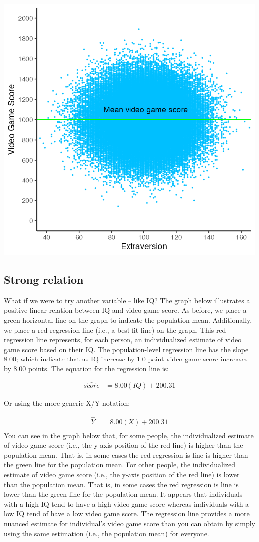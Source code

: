 \documentclass[
]{krantz}
\begin{document}
\includegraphics[width=0.7\linewidth]{ch_correlation/images/pop_graph_extraversion_mean}

\hypertarget{strong-relation}{%
\subsection{Strong relation}\label{strong-relation}}

What if we were to try another variable -- like IQ? The graph below illustrates a positive linear relation between IQ and video game score. As before, we place a green horizontal line on the graph to indicate the population mean. Additionally, we place a red regression line (i.e., a best-fit line) on the graph. This red regression line represents, for each person, an individualized estimate of video game score based on their IQ. The population-level regression line has the slope 8.00; which indicate that as IQ increase by 1.0 point video game score increases by 8.00 points. The equation for the regression line is:

\[
\begin{aligned}
\widehat{score} &= 8.00(IQ) + 200.31
\end{aligned}
\]

Or using the more generic X/Y notation:

\[
\begin{aligned}
\hat{Y} &= 8.00(X) + 200.31 \\
\end{aligned}
\]
You can see in the graph below that, for some people, the individualized estimate of video game score (i.e., the y-axis position of the red line) is higher than the population mean. That is, in some cases the red regression is line is higher than the green line for the population mean. For other people, the individualized estimate of video game score (i.e., the y-axis position of the red line) is lower than the population mean. That is, in some cases the red regression is line is lower than the green line for the population mean. It appears that individuals with a high IQ tend to have a high video game score whereas individuals with a low IQ tend of have a low video game score. The regression line provides a more nuanced estimate for individual's video game score than you can obtain by simply using the same estimation (i.e., the population mean) for everyone.
\end{document}
